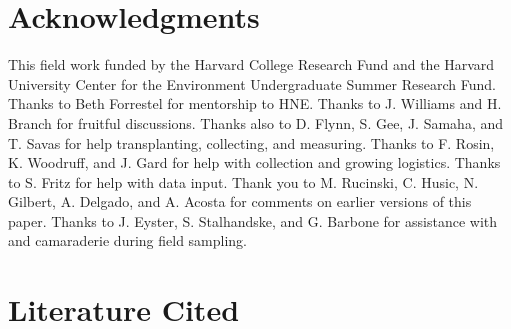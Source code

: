 \documentclass[12pt]{article}\usepackage[]{graphicx}\usepackage[]{color}
\begin{document}
	
	\section{Acknowledgments}
	 This field work funded by the Harvard College Research Fund and the Harvard University Center for the Environment Undergraduate Summer Research Fund. Thanks to Beth Forrestel for mentorship to HNE. Thanks to J. Williams and H. Branch for fruitful discussions. Thanks also to D. Flynn, S. Gee, J. Samaha, and T. Savas for help transplanting, collecting, and measuring. Thanks to F. Rosin, K. Woodruff, and J. Gard for help with collection and growing logistics. Thanks to S. Fritz for help with data input. Thank you to M. Rucinski, C. Husic, N. Gilbert, A. Delgado, and A. Acosta for comments on earlier versions of this paper. Thanks to J. Eyster, S. Stalhandske, and G. Barbone for assistance with and camaraderie during field sampling. 

	

\section{Literature Cited}
\printbibliography
\end{document}
